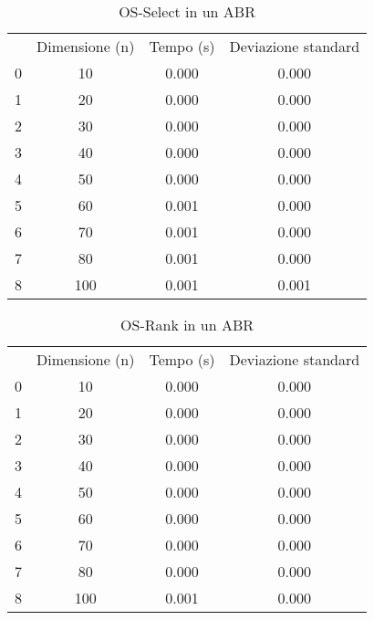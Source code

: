 \begin{table}[H]
\centering
\caption{OS-Select in un ABR}
\label{OS-Select in un ABR}
\begin{tabular}{cccc}
 & Dimensione (n) & Tempo (s) & Deviazione standard \\
0 & 10 & 0.000 & 0.000 \\
\cline{1-4}
1 & 20 & 0.000 & 0.000 \\
\cline{1-4}
2 & 30 & 0.000 & 0.000 \\
\cline{1-4}
3 & 40 & 0.000 & 0.000 \\
\cline{1-4}
4 & 50 & 0.000 & 0.000 \\
\cline{1-4}
5 & 60 & 0.001 & 0.000 \\
\cline{1-4}
6 & 70 & 0.001 & 0.000 \\
\cline{1-4}
7 & 80 & 0.001 & 0.000 \\
\cline{1-4}
8 & 100 & 0.001 & 0.001 \\
\cline{1-4}
\end{tabular}
\end{table}

\begin{table}[H]
\centering
\caption{OS-Rank in un ABR}
\label{OS-Rank in un ABR}
\begin{tabular}{cccc}
 & Dimensione (n) & Tempo (s) & Deviazione standard \\
0 & 10 & 0.000 & 0.000 \\
\cline{1-4}
1 & 20 & 0.000 & 0.000 \\
\cline{1-4}
2 & 30 & 0.000 & 0.000 \\
\cline{1-4}
3 & 40 & 0.000 & 0.000 \\
\cline{1-4}
4 & 50 & 0.000 & 0.000 \\
\cline{1-4}
5 & 60 & 0.000 & 0.000 \\
\cline{1-4}
6 & 70 & 0.000 & 0.000 \\
\cline{1-4}
7 & 80 & 0.000 & 0.000 \\
\cline{1-4}
8 & 100 & 0.001 & 0.000 \\
\cline{1-4}
\end{tabular}
\end{table}
